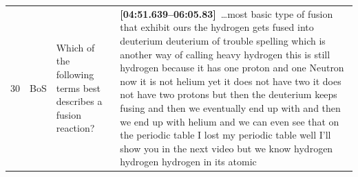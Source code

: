 \documentclass[10pt]{article}
\begin{document}
\begin{tiny}
\begin{longtable}{r p{0.3in} p{1.212in} p{3.8in}}
    30 &          BoS &                                                                                                                                                                                                                   Which of the following terms best describes a fusion reaction? &                                                                                                                                                                                                                                                                                                                                                                                                                                                                                                                                                                                                                                                                                                                                                                                                                                                                                                                                                                                                                                                                                                                                                                                                                                                                                                                                                                                                                                                                                                                                                                                                                                                                                                                                                                                                                                                                                                                                                                                                                                                                                                                                                                                                                                                                                                                                                                                                                                                                    \textbf{[04:51.639--06:05.83]}~\ldots most basic type of fusion that exhibit ours the hydrogen gets fused into deuterium deuterium of trouble spelling which is another way of calling heavy hydrogen this is still hydrogen because it has one proton and one Neutron now it is not helium yet it does not have two it does not have two protons but then the deuterium keeps fusing and then we eventually end up with and then we end up with helium and we can even see that on the periodic table I lost my periodic table well I'll show you in the next video but we know hydrogen hydrogen hydrogen in its atomic 
\end{longtable}
\end{tiny}
\end{document}
